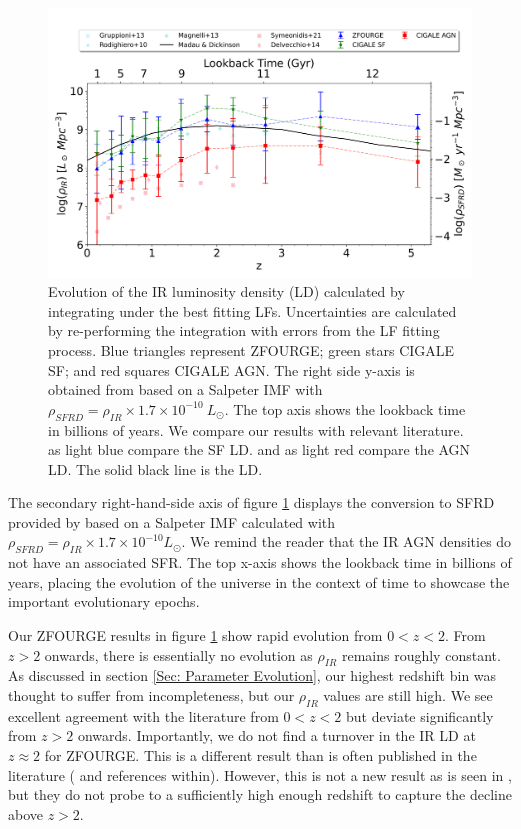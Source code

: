 \begin{figure}[t!]
    \centering
    \includegraphics[width=\textwidth]{Figures/SFRD.png}
    \caption{Evolution of the IR luminosity density (LD) calculated by integrating under the best fitting LFs. Uncertainties are calculated by re-performing the integration with errors from the LF fitting process. Blue triangles represent ZFOURGE; green stars CIGALE SF; and red squares CIGALE AGN. The right side y-axis is obtained from \cite{kennicutt_global_1998} based on a Salpeter IMF with $\rho_{SFRD} = \rho_{IR} \times 1.7\times10^{-10} \ L_{\odot}$. The top axis shows the lookback time in billions of years. We compare our results with relevant literature. \cite{gruppioni_herschel_2013, rodighiero_mid-_2010, magnelli_deepest_2013} as light blue compare the SF LD. \cite{symeonidis_agn_2021} and \cite{delvecchio_tracing_2014} as light red compare the AGN LD. The solid black line is the \cite{madau_cosmic_2014} LD.}
    \label{Fig: SFRD}
\end{figure}

The secondary right-hand-side axis of figure \ref{Fig: SFRD} displays the conversion to SFRD provided by \cite{kennicutt_global_1998} based on a Salpeter IMF calculated with $\rho_{SFRD} = \rho_{IR} \times 1.7\times10^{-10} L_{\odot}$. We remind the reader that the IR AGN densities do not have an associated SFR. The top x-axis shows the lookback time in billions of years, placing the evolution of the universe in the context of time to showcase the important evolutionary epochs.

Our ZFOURGE results in figure \ref{Fig: SFRD} show rapid evolution from $0<z<2$. From $z>2$ onwards, there is essentially no evolution as $\rho_{IR}$ remains roughly constant. As discussed in section \ref{Sec: Parameter Evolution}, our highest redshift bin was thought to suffer from incompleteness, but our $\rho_{IR}$ values are still high. We see excellent agreement with the literature from $0<z<2$ but deviate significantly from $z>2$ onwards. Importantly, we do not find a turnover in the IR LD at $z\approx2$ for ZFOURGE. This is a different result than is often published in the literature (\citealp{gruppioni_herschel_2013, magnelli_deepest_2013, madau_cosmic_2014, lutz_far-infrared_2014} and references within). However, this is not a new result as is seen in \cite{rodighiero_mid-_2010}, but they do not probe to a sufficiently high enough redshift to capture the decline above $z>2$.

